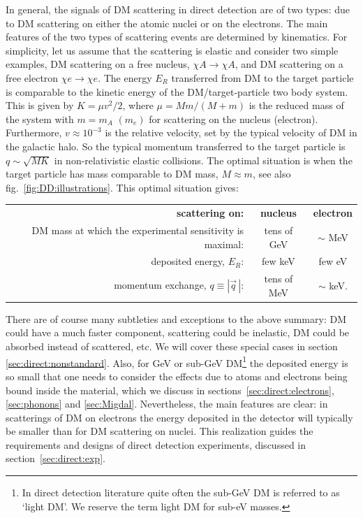 In general, the signals of DM scattering  in direct detection are of two types: due to DM scattering on either
the atomic nuclei or on the electrons. The main features of the two types of scattering events are determined by kinematics.  For simplicity, let us assume that the scattering is elastic and consider two simple examples,   DM scattering on a free nucleus, $\chi A\to \chi A$, and DM scattering on a free electron $\chi e\to \chi e$. The energy $E_R$ transferred from DM to the target particle is comparable to the kinetic energy of the DM/target-particle two body system. 
This is given by  $K=\mu v^2/2$, where  $\mu = M m/(M+m)$ is the reduced mass of the system 
with $m=m_A$ $(m_e)$ for scattering on the nucleus (electron).
Furthermore, $v\approx 10^{-3}$ is the relative velocity, set by the typical velocity of DM in the galactic halo. 
So the typical momentum transferred to the target particle is $q \sim\sqrt{M K}$ in non-relativistic elastic collisions.
The optimal situation is when the target particle has mass comparable to DM mass, $M\approx m$, see also fig.~\ref{fig:DD:illustrations}. This optimal situation gives:
\begin{center}
\begin{tabular}{rcc}
{\bf scattering on:} & {\bf nucleus} & {\bf electron} \\[0.3ex]
DM mass at which the experimental sensitivity is maximal: & tens of GeV & $\sim$ MeV\\
deposited energy, $E_R$: & few keV & few eV \\
momentum exchange, $q\equiv |\vec q\,|$: & tens of MeV & $\sim$ keV.
\end{tabular}
\end{center}
There are of course many subtleties and exceptions to the above summary: DM could have a much faster component, scattering could be inelastic, DM could be absorbed instead of scattered, etc. We will cover these special cases in section \ref{sec:direct:nonstandard}. Also, for GeV or sub-GeV DM\footnote{In direct detection literature quite often the sub-GeV DM is referred to as `light DM'. We reserve the term light DM for sub-eV masses.} the deposited energy is so small that one needs to consider the effects due to atoms and electrons being bound inside the material, which we discuss in sections~\ref{sec:direct:electrons}, \ref{sec:phonons} and \ref{sec:Migdal}. Nevertheless, the main features are clear: in scatterings of DM on electrons the energy deposited in the detector will typically be smaller  than for DM scattering on nuclei. This realization guides the requirements and designs of direct detection experiments, discussed in section~\ref{sec:direct:exp}.

